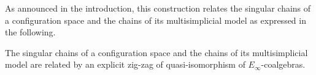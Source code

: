 As announced in the introduction, this construction relates the singular chains of a configuration space and the chains of its multisimplicial model as expressed in the following.

\begin{theorem}
	The singular chains of a configuration space and the chains of its multisimplicial model are related by an explicit zig-zag of quasi-isomorphism of $E_\infty$-coalgebras.
\end{theorem}